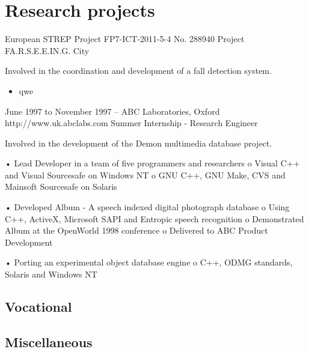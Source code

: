 \section{Research projects}

%
{European STREP Project FP7-ICT-2011-5-4 No. 288940}%
{Project FA.R.S.E.E.IN.G.}%
{City}%
{}%
{Involved in the coordination and development of a fall detection system.\\
\begin{itemize}
	\item qwe
\end{itemize}}



June 1997 to November 1997 – ABC  Laboratories, Oxford
http://www.uk.abclabs.com
Summer Internship - Research Engineer

Involved in the development of the Demon multimedia database project.

•	Lead Developer in a team of five programmers and researchers
  o	Visual C++ and Visual Sourcesafe on Windows NT
  o	GNU C++, GNU Make, CVS and Mainsoft Sourcesafe on Solaris
  
•	Developed Album - A speech indexed digital photograph database
  o	Using C++, ActiveX, Microsoft SAPI and Entropic speech recognition
  o	Demonstrated Album at the OpenWorld 1998 conference
  o	Delivered to ABC Product Development
  
•	Porting an experimental object database engine 
  o	C++, ODMG standards, Solaris and Windows NT


\subsection{Vocational}

\subsection{Miscellaneous}
